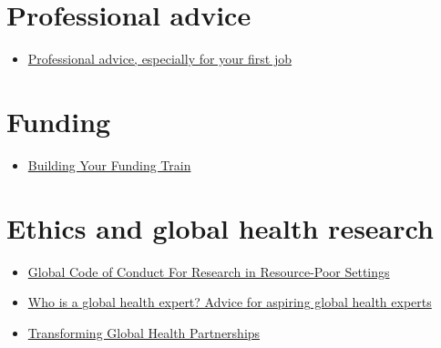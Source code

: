 \documentclass[
]{book}
\providecommand{\tightlist}{%
  \setlength{\itemsep}{0pt}\setlength{\parskip}{0pt}}
\begin{document}
\section{Professional advice}\label{professional-advice}

\begin{itemize}
\tightlist
\item
  \href{https://docs.google.com/document/d/1ckgRCcr7FFPyymyMA6Y_-cB_vftOyrrxT28c6gRg0PI/edit}{Professional advice, especially for your first job}
\end{itemize}

\section{Funding}\label{funding}

\begin{itemize}
\tightlist
\item
  \href{https://grantwriting.stanford.edu/funding-train/\#ep}{Building Your Funding Train}
\end{itemize}

\section{Ethics and global health research}\label{ethics-and-global-health-research}

\begin{itemize}
\tightlist
\item
  \href{https://www.globalcodeofconduct.org/wp-content/uploads/2018/05/Global-Code-of-Conduct-Brochure.pdf}{Global Code of Conduct For Research in Resource-Poor Settings}
\item
  \href{https://journals.plos.org/globalpublichealth/article?id=10.1371/journal.pgph.0002269}{Who is a global health expert? Advice for aspiring global health experts}
\item
  \href{https://link.springer.com/book/9783031537929}{Transforming Global Health Partnerships}
\end{itemize}


\end{document}
